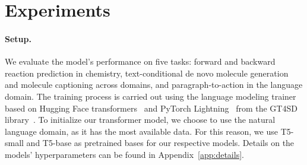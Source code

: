 \documentclass[nohyperref]{article}
\theoremstyle{plain}
\theoremstyle{definition}
\theoremstyle{remark}
\begin{document}
 \section{Experiments}
\label{section:experiment}
\paragraph{Setup.}
We evaluate the model's performance on five tasks: forward and backward reaction prediction in chemistry, text-conditional de novo molecule generation and molecule captioning across domains, and paragraph-to-action in the language domain.
The training process is carried out using the language modeling trainer based on Hugging Face transformers~\citep{Wolf_Transformers_State-of-the-Art_Natural_2020} and PyTorch Lightning~\citep{Falcon_PyTorch_Lightning_2019} from the GT4SD library~\citep{manica2022gt4sd}.
To initialize our transformer model, we choose to use the natural language domain, as it has the most available data. For this reason, we use T5-small and T5-base as pretrained bases for our respective models.
Details on the models' hyperparameters can be found in Appendix~\ref{app:details}.
\end{document}
